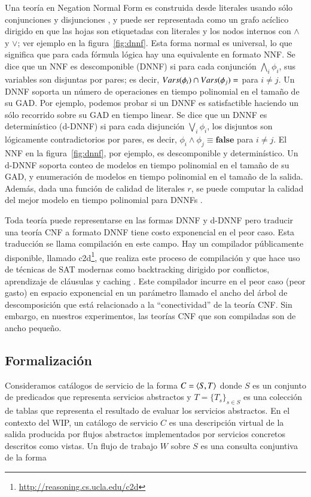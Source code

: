 Una teoría en Negation Normal Form es construida desde literales usando sólo
conjunciones y disjunciones \cite{barwise:handbook}, y puede ser representada como un grafo
acíclico dirigido en que las hojas son etiquetadas con literales y los nodos
internos con $\land$ y $\lor$; ver ejemplo en la figura~\ref{fig:dnnf}. Esta
forma normal es universal, lo que significa que para cada fórmula lógica hay una
equivalente en formato NNF. Se dice que un NNF es descomponible (DNNF)
\cite{darwiche:d-dnnfs}
si para cada conjunción $\bigwedge_i\phi_i$, sus variables son disjuntas por pares; es
decir, $Vars(\phi_i)\cap Vars(\phi_j)=\empty$ para $i\neq j$. Un DNNF soporta un
número de operaciones en tiempo polinomial en el tamaño de su GAD. Por ejemplo,
podemos probar si un DNNF es satisfactible haciendo un sólo recorrido 
sobre su GAD en tiempo linear. Se dice que un DNNF es
determinístico (d-DNNF) \cite{darwiche:d-dnnfs} si para cada disjunción $\bigvee_i\phi_i$, los
disjuntos son lógicamente contradictorios por pares, es decir,
$\phi_i\land\phi_j\equiv\textbf{false}$ para $i\neq j$.
El NNF en la figura~\ref{fig:dnnf}, por ejemplo, es
descomponible y determinístico. Un d-DNNF soporta conteo de modelos en
tiempo polinomial en el tamaño de su GAD, y enumeración de modelos en tiempo
polinomial en el tamaño de la salida. Además, dada una función de calidad de
literales $r$, se puede computar la calidad del mejor modelo en tiempo
polinomial para DNNFs \cite{darwiche:weighted}.

Toda teoría puede representarse en las formas DNNF y d-DNNF pero traducir una teoría CNF a
formato DNNF tiene costo exponencial en el peor caso. Esta traducción se
llama compilación en este campo. Hay un compilador públicamente disponible,
llamado c2d\footnote{\url{http://reasoning.cs.ucla.edu/c2d}}, que realiza este proceso de compilación y que hace uso
de técnicas de SAT modernas como backtracking dirigido por conflictos,
aprendizaje de cláusulas y caching \cite{darwiche:compiler}. Este compilador incurre en el peor
caso (peor gasto) en espacio exponencial en un parámetro llamado el ancho del árbol de
descomposición que está relacionado a la ``conectividad'' de la teoría CNF.
Sin embargo, en nuestros experimentos, las teorías CNF que son compiladas son de
ancho pequeño.

\subsection{Formalización}

Consideramos catálogos de servicio de la forma $C=\langle S,T \rangle$ donde $S$ es un
conjunto de predicados que representa servicios abstractos y $T=\{T_s\}_{s\in S}$ es una
colección de tablas que representa el resultado de evaluar los servicios
abstractos. En el contexto del WIP, un catálogo de servicio $C$ es una
descripción virtual de la salida producida por flujos abstractos
implementados por servicios concretos descritos como vistas. Un flujo de trabajo
$W$ sobre $S$ es una consulta conjuntiva de la forma

